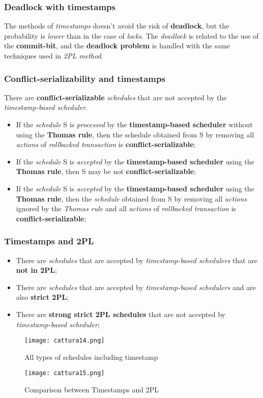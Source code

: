 \documentclass{article}
\begin{document}
\subsubsection{Deadlock with timestamps}
The methods of \emph{timestamps} doesn't avoid the risk of \textbf{deadlock}, but the probability is \emph{lower} than in the case of \emph{locks}. The \emph{deadlock} is related to the use of the\textbf{ commit-bit}, and the \textbf{deadlock problem} is handled with the same techniques used in \emph{2PL method}.
\subsubsection{Conflict-serializability and timestamps}
There are \textbf{conflict-serializable} \emph{schedules} that are not accepted by the \emph{timestamp-based scheduler}. 
\begin{itemize}
\item If the \emph{schedule} S is \emph{processed} by the \textbf{timestamp-based scheduler} without using the \textbf{Thomas rule}, then the schedule obtained from S by removing all \emph{actions} of \emph{rollbacked transaction} is \textbf{conflict-serializable};
\item If the \emph{schedule} S is \emph{accepted} by the \textbf{timestamp-based scheduler} using the \textbf{Thomas rule}, then S may be not \textbf{conflict-serializable};
\item If the \emph{schedule} S is \emph{accepted} by the \textbf{timestamp-based scheduler} using the \textbf{Thomas rule}, then the \emph{schedule} obtained from S by removing all \emph{actions} ignored by the \emph{Thomas rule} and all \emph{actions} of \emph{rollbacked transaction} is \textbf{conflict-serializable};
\end{itemize}
\subsubsection{Timestamps and 2PL}
\begin{itemize}
\item There are \emph{schedules} that are accepted by \emph{timestamp-based schedulers} that are \textbf{not in 2PL};
\item There are \emph{schedules} that are accepted by \emph{timestamp-based schedulers} and are also \textbf{strict 2PL};
\item There are \textbf{strong strict 2PL schedules} that are not accepted by \emph{timestamp-based scheduler};
\end{itemize}
\begin{figure}[H]
  \centering
  \texttt{[image: cattura14.png]}
   \caption{All types of schedules including timestamp}
\end{figure}
\begin{figure}[H]
  \centering
  \texttt{[image: cattura15.png]}
   \caption{Comparison between Timestamps and 2PL}
\end{figure}
\end{document}
